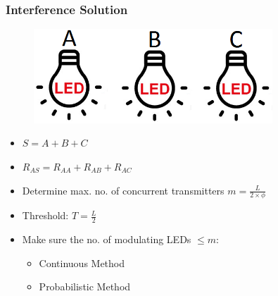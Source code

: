 \documentclass{beamer}
\begin{document}
	\begin{frame}\frametitle{Interference Solution}

		\begin{minipage}{.5\linewidth}
			\begin{figure}
				\centering
				\includegraphics[width=0.8\textwidth]{correlation-leds.png}
			\end{figure}
		\end{minipage}%
		\begin{minipage}{.5\linewidth}
			\begin{itemize}
				\item $S = A + B + C$

				\item $R_{AS} = R_{AA} + R_{AB} + R_{AC}$

			\end{itemize}
		\end{minipage}
		\vspace{10mm}
		\begin{itemize}
			\item Determine max. no. of concurrent transmitters $m = \frac{L}{2 \times \phi}$
			\item Threshold: $T = \frac{L}{2}$ %
			\item Make sure the no. of modulating LEDs $\le m$:
				\begin{itemize}
					\item Continuous Method
					\item Probabilistic Method
				\end{itemize}
		\end{itemize}




\end{frame}
\end{document}
